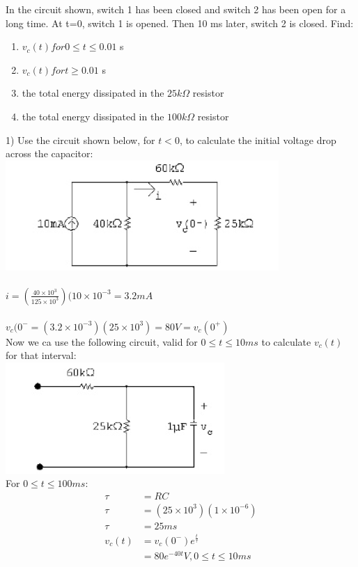 In the circuit shown, switch 1 has been closed and switch 2 has been open for a long time. At t=0,
switch 1 is opened. Then 10 ms later, switch 2 is closed. Find:

\begin{enumerate}
	\item $v_c(t) for 0 \leq t \leq 0.01$ s
	\item $v_c(t) for t \geq 0.01$ s
	\item the total energy dissipated in the $25 k\Omega$ resistor
	\item the total energy dissipated in the $100 k\Omega$ resistor
\end{enumerate}

1) Use the circuit shown below, for $t < 0$, to calculate the initial
voltage drop across the capacitor:\\
\includegraphics{img/c7/a21} \\
\\ $ i = \left(\frac{40 \times 10^{3}}{125 \times 10^{3}} \right)(10 \times 10^{-3} = 3.2 mA $ \\
\\ $v_c(0^{-} = (3.2 \times 10^{-3})(25 \times 10^{3}) = 80 V = v_c(0^{+})$ \\
Now we ca use the following circuit, valid for $0 \leq t \leq 10 ms$ to 
calculate $v_c(t)$ for that interval: \\
\includegraphics{img/c7/a22} \\
For $0 \leq t \leq 100 ms$: 
\begin{align*}
	\tau &= RC \\
	\tau &= (25 \times 10^3)(1 \times 10^{-6}) \\
	\tau &= 25 ms \\
	v_c(t) &= v_c(0^{-})e^{\frac{t}{\tau}} \\
	&= 80e^{-40t} V, 0 \leq t \leq 10ms \\	
\end{align*}
